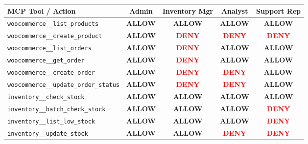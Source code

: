 \documentclass[11pt,a4paper]{article}
\begin{document}
\begin{table}[h!]
\centering
\small
\begin{tabularx}{\textwidth}{p{3.8cm} c c c c}
\toprule
\textbf{MCP Tool / Action} & \textbf{Admin} & \textbf{Inventory Mgr} & \textbf{Analyst} & \textbf{Support Rep} \\
\midrule
\texttt{woocommerce\_\_list\_products}     & \textcolor{accent}{\textbf{ALLOW}} & \textcolor{accent}{\textbf{ALLOW}} & \textcolor{accent}{\textbf{ALLOW}} & \textcolor{accent}{\textbf{ALLOW}} \\
\texttt{woocommerce\_\_create\_product}   & \textcolor{accent}{\textbf{ALLOW}} & \textcolor{red}{\textbf{DENY}}   & \textcolor{red}{\textbf{DENY}}   & \textcolor{red}{\textbf{DENY}}   \\
\texttt{woocommerce\_\_list\_orders}       & \textcolor{accent}{\textbf{ALLOW}} & \textcolor{red}{\textbf{DENY}}   & \textcolor{accent}{\textbf{ALLOW}} & \textcolor{accent}{\textbf{ALLOW}} \\
\texttt{woocommerce\_\_get\_order}         & \textcolor{accent}{\textbf{ALLOW}} & \textcolor{red}{\textbf{DENY}}   & \textcolor{accent}{\textbf{ALLOW}} & \textcolor{accent}{\textbf{ALLOW}} \\
\texttt{woocommerce\_\_create\_order}      & \textcolor{accent}{\textbf{ALLOW}} & \textcolor{red}{\textbf{DENY}}   & \textcolor{red}{\textbf{DENY}}   & \textcolor{accent}{\textbf{ALLOW}} \\
\texttt{woocommerce\_\_update\_order\_status}& \textcolor{accent}{\textbf{ALLOW}} & \textcolor{red}{\textbf{DENY}} & \textcolor{red}{\textbf{DENY}}   & \textcolor{accent}{\textbf{ALLOW}} \\
\addlinespace
\texttt{inventory\_\_check\_stock}         & \textcolor{accent}{\textbf{ALLOW}} & \textcolor{accent}{\textbf{ALLOW}} & \textcolor{accent}{\textbf{ALLOW}} & \textcolor{accent}{\textbf{ALLOW}} \\
\texttt{inventory\_\_batch\_check\_stock}   & \textcolor{accent}{\textbf{ALLOW}} & \textcolor{accent}{\textbf{ALLOW}} & \textcolor{accent}{\textbf{ALLOW}} & \textcolor{red}{\textbf{DENY}}   \\
\texttt{inventory\_\_list\_low\_stock}     & \textcolor{accent}{\textbf{ALLOW}} & \textcolor{accent}{\textbf{ALLOW}} & \textcolor{accent}{\textbf{ALLOW}} & \textcolor{red}{\textbf{DENY}}   \\
\texttt{inventory\_\_update\_stock}        & \textcolor{accent}{\textbf{ALLOW}} & \textcolor{accent}{\textbf{ALLOW}} & \textcolor{red}{\textbf{DENY}}   & \textcolor{red}{\textbf{DENY}}   \\

\end{tabularx}
\end{table}
\end{document}

